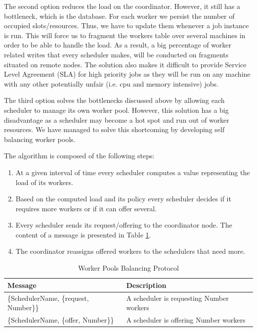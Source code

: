 \documentclass[11pt,a4paper,twoside]{report}
\begin{document}
The second option reduces the load on the coordinator. However, it still has a bottleneck, which is the database. For each worker we persist the number of occupied slots/resources. Thus, we have to update them whenever a job instance is run. This will force us to fragment the workers table over several machines in order to be able to handle the load. As a result, a big percentage of worker related writes that every scheduler makes, will be conducted on fragments situated on remote nodes. The solution also makes it difficult to provide Service Level Agreement (SLA) for high priority jobs as they will be run on any machine with any other potentially unfair (i.e. cpu and memory intensive) jobs.


The third option solves the bottlenecks discussed above by allowing each scheduler to manage its own worker pool. However, this solution has a big disadvantage as a scheduler may become a hot spot and run out of worker resources. We have managed to solve this shortcoming by developing self balancing worker pools.


The algorithm is composed of the following steps:
\begin{enumerate}
\item{}
At a given interval of time every scheduler computes a value representing the load of its workers.
\item{}
Based on the computed load and its policy every scheduler decides if it requires more workers or if it can offer several.
\item{}
Every scheduler sends its request/offering to the coordinator node. The content of a message is presented in Table \ref{tab:WorkersBalancing}.
\item{}
The coordinator reassigns offered workers to the schedulers that need more.
\end{enumerate}


\begin{table}[h]
\centering
\begin{tabular}{|l|p{6.0cm}|}
\hline
\textbf{Message} & \textbf{Description}\\ \hline
\{SchedulerName, \{request, Number\}\} & A scheduler is requesting Number workers
\\ \hline
\{SchedulerName, \{offer, Number\}\} & A scheduler is offering Number workers
\\ \hline
\end{tabular}
\caption{Worker Pools Balancing Protocol}
\label{tab:WorkersBalancing}
\end{table}
\end{document}
